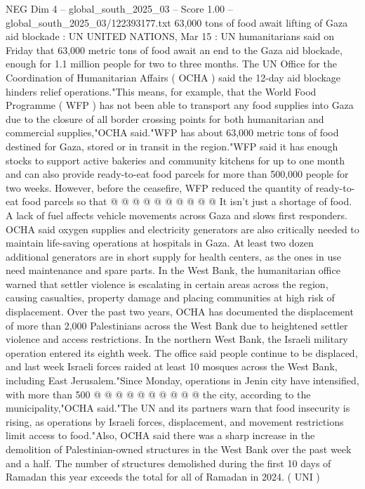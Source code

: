 \begin{textsample}{NEG Dim 4 – global\_south\_2025\_03 – Score 1.00 – global\_south\_2025\_03/122393177.txt}  \label{ex:f4_neg_426}
63,000 tons of food await lifting of Gaza aid blockade : UN UNITED NATIONS, Mar 15 : UN humanitarians said on Friday that 63,000 metric tons of food await an end to the Gaza aid blockade, enough for 1.1 million people for two to three months.
The UN Office for the Coordination of Humanitarian Affairs ( OCHA ) said the 12-day aid blockage hinders relief operations."This means, for example, that the World Food Programme ( WFP ) has not been able to transport any food supplies into Gaza due to the closure of all border crossing points for both humanitarian and commercial supplies,"OCHA said."WFP has about 63,000 metric tons of food destined for Gaza, stored or in transit in the region."WFP said it has enough stocks to support active bakeries and community kitchens for up to one month and can also provide ready-to-eat food parcels for more than 500,000 people for two weeks.
However, before the ceasefire, WFP reduced the quantity of ready-to-eat food parcels so that @ @ @ @ @ @ @ @ @ @ It isn't just a shortage of food.
A lack of fuel affects vehicle movements across Gaza and slows first responders.
OCHA said oxygen supplies and electricity generators are also critically needed to maintain life-saving operations at hospitals in Gaza.
At least two dozen additional generators are in short supply for health centers, as the ones in use need maintenance and spare parts.
In the West Bank, the humanitarian office warned that settler violence is escalating in certain areas across the region, causing casualties, property damage and placing communities at high risk of displacement.
Over the past two years, OCHA has documented the displacement of more than 2,000 Palestinians across the West Bank due to heightened settler violence and access restrictions.
In the northern West Bank, the Israeli military operation entered its eighth week.
The office said people continue to be displaced, and last week Israeli forces raided at least 10 mosques across the West Bank, including East Jerusalem."Since Monday, operations in Jenin city have intensified, with more than 500 @ @ @ @ @ @ @ @ @ @ the city, according to the municipality,"OCHA said."The UN and its partners warn that food insecurity is rising, as operations by Israeli forces, displacement, and movement restrictions limit access to food."Also, OCHA said there was a sharp increase in the demolition of Palestinian-owned structures in the West Bank over the past week and a half.
The number of structures demolished during the first 10 days of Ramadan this year exceeds the total for all of Ramadan in 2024. ( UNI )

\end{textsample}
